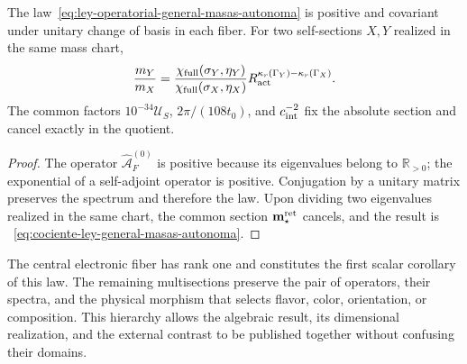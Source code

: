 \begin{theorem}
\label{thm:covariancia-ley-general-masas-autonoma}
The law~\eqref{eq:ley-operatorial-general-masas-autonoma} is positive and
covariant under unitary change of basis in each fiber. For two self-sections
\(X,Y\) realized in the same mass chart,
\begin{equation}
 \frac{m_Y}{m_X}
 =\frac{\chi_{\rm full}(\sigma_Y,\eta_Y)}
        {\chi_{\rm full}(\sigma_X,\eta_X)}
  R_{\rm act}^{\kappa_r(\Gamma_Y)-\kappa_r(\Gamma_X)}.
 \label{eq:cociente-ley-general-masas-autonoma}
\end{equation}
The common factors \(10^{-34}\mathcal U_S\), \(2\pi/(108t_0)\), and
\(c_{\rm int}^{-2}\) fix the absolute section and cancel exactly in
the quotient.
\end{theorem}

\begin{proof}
The operator \(\widehat{\mathcal A}^{(0)}_F\) is positive because its
eigenvalues belong to \(\mathbb R_{>0}\); the exponential of a
self-adjoint operator is positive. Conjugation by a unitary matrix preserves the
spectrum and therefore the law. Upon dividing two eigenvalues realized in the
same chart, the common section \(\mathbf m_\star^{\rm ret}\) cancels, and the result
is ~\eqref{eq:cociente-ley-general-masas-autonoma}.
\end{proof}

The central electronic fiber has rank one and constitutes the first
scalar corollary of this law. The remaining multisections preserve the pair
of operators, their spectra, and the physical morphism that selects flavor,
color, orientation, or composition. This hierarchy allows the algebraic
result, its dimensional realization, and the external contrast to be published together without
confusing their domains.
